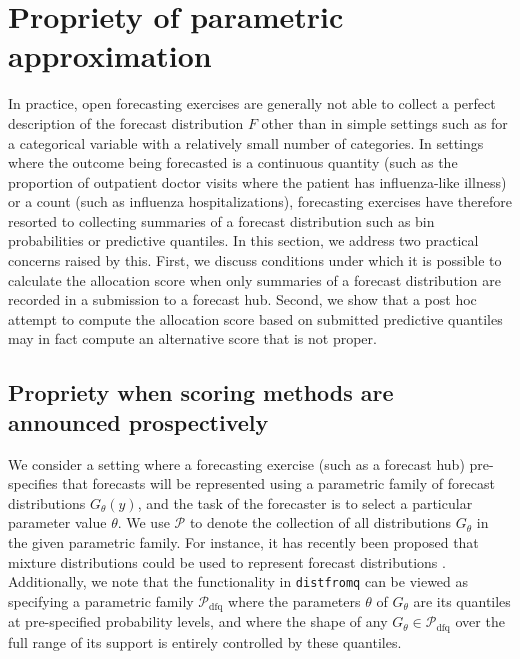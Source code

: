 \documentclass{article}\usepackage[]{graphicx}\usepackage[]{xcolor}
\begin{document}
\section{Propriety of parametric approximation} %
\label{sec:a:propriety_of_parametric_approximation}

In practice, open forecasting exercises are generally not able to collect a perfect description of the forecast
distribution $F$ other than in simple settings such as for a categorical variable with a relatively small number of
categories. In settings where the outcome being forecasted is a continuous quantity (such as the proportion of
outpatient doctor visits where the patient has influenza-like illness) or a count (such as influenza hospitalizations),
forecasting exercises have therefore resorted to collecting summaries of a forecast distribution such as bin
probabilities or predictive quantiles. In this section, we address two practical concerns raised by this. First, we
discuss conditions under which it is possible to calculate the allocation score when only summaries of a forecast
distribution are recorded in a submission to a forecast hub. Second, we show that a post hoc attempt to compute the
allocation score based on submitted predictive quantiles may in fact compute an alternative score that is not proper.

\subsection{Propriety when scoring methods are announced prospectively}

We consider a setting where a forecasting exercise (such as a forecast hub) pre-specifies that forecasts will be
represented using a parametric family of forecast distributions $G_\theta(y)$, and the task of the forecaster is to
select a particular parameter value $\theta$. We use $\mathcal{P}$ to denote the collection of all distributions
$G_\theta$ in the given parametric family. For instance, it has recently been proposed that mixture distributions could
be used to represent forecast distributions \citep{wadsworth2023mixture}. Additionally, we note that the functionality
in \verb`distfromq` can be viewed as specifying a parametric family $\mathcal{P}_{\mathrm{dfq}}$ where the parameters
$\theta$ of $G_\theta$ are its quantiles at pre-specified probability levels, and where the shape of any $G_\theta \in
\mathcal{P}_{\mathrm{dfq}}$ over the full range of its support is entirely controlled by these quantiles.
\end{document}
